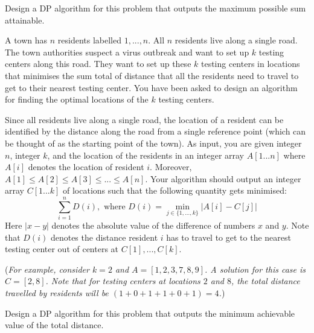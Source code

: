 \documentclass[answers]{exam}
\begin{document}
\begin{questions}
Design a DP algorithm for this problem that outputs the maximum possible sum attainable.


\begin{solution}

\end{solution}

\question[20] A town has $n$ residents labelled $1, ..., n$. 
All $n$ residents live along a single road. The town authorities suspect a virus outbreak and want to set up $k$ testing centers along this road. 
They want to set up these $k$ testing centers in locations that minimises the sum total of distance that all the residents need to travel to get to their nearest testing center. 
You have been asked to design an algorithm for finding the optimal locations of the $k$ testing centers.

Since all residents live along a single road, the location of a resident can be identified by the distance along the road from a single reference point (which can be thought of as the starting point of the town). 
As input, you are given integer $n$, integer $k$, and the location of the residents in an integer array $A[1...n]$ where $A[i]$ denotes the location of resident $i$. Moreover, $A[1] \leq A[2] \leq A[3] \leq ... \leq A[n]$. Your algorithm should output an integer array $C[1...k]$ of locations such that the following quantity gets minimised: 
\[
\sum_{i=1}^{n} D(i), \textrm{ where } D(i) = \min_{j \in \{1, ..., k\}}{\lvert A[i] - C[j] \rvert}
\]
Here $\lvert x - y \rvert$ denotes the absolute value of the difference of numbers $x$ and $y$. Note that $D(i)$ denotes the distance resident $i$ has to travel to get to the nearest testing center out of centers at $C[1], ..., C[k]$.


({\it For example, consider $k = 2$ and $A = [1, 2, 3, 7, 8, 9]$. A solution for this case is $C = [2, 8]$. Note that for testing centers at locations $2$ and $8$, the total distance travelled by residents will be $(1 + 0 + 1 + 1 + 0 + 1) = 4$.})


Design a DP algorithm for this problem that outputs the minimum achievable value of the total distance.



\begin{solution}

\end{solution}


\end{questions}
\end{document}

